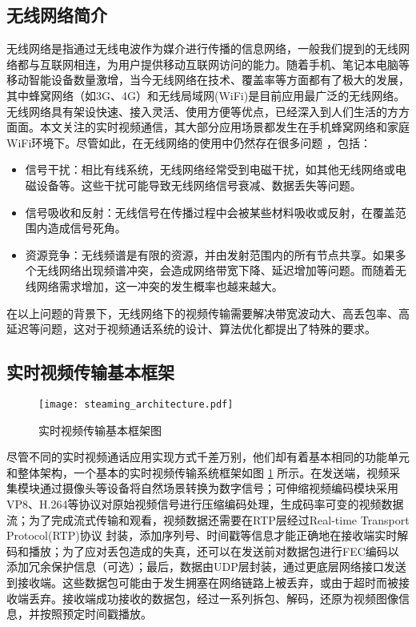 \subsection{无线网络简介}
无线网络是指通过无线电波作为媒介进行传播的信息网络，一般我们提到的无线网络都与互联网相连，为用户提供移动互联网访问的能力。随着手机、笔记本电脑等移动智能设备数量激增，当今无线网络在技术、覆盖率等方面都有了极大的发展，其中蜂窝网络（如3G、4G）和无线局域网(WiFi)是目前应用最广泛的无线网络。无线网络具有架设快速、接入灵活、使用方便等优点，已经深入到人们生活的方方面面。本文关注的实时视频通信，其大部分应用场景都发生在手机蜂窝网络和家庭WiFi环境下。尽管如此，在无线网络的使用中仍然存在很多问题 \cite{heusse2003performance}，包括：
\begin{itemize}
    \item 信号干扰：相比有线系统，无线网络经常受到电磁干扰，如其他无线网络或电磁设备等。这些干扰可能导致无线网络信号衰减、数据丢失等问题。
    \item 信号吸收和反射：无线信号在传播过程中会被某些材料吸收或反射，在覆盖范围内造成信号死角。
    \item 资源竞争：无线频谱是有限的资源，并由发射范围内的所有节点共享。如果多个无线网络出现频谱冲突，会造成网络带宽下降、延迟增加等问题。而随着无线网络需求增加，这一冲突的发生概率也越来越大。
\end{itemize}

在以上问题的背景下，无线网络下的视频传输需要解决带宽波动大、高丢包率、高延迟等问题，这对于视频通话系统的设计、算法优化都提出了特殊的要求。


\subsection{实时视频传输基本框架}

\begin{figure}[htbp]
  \centering
  \texttt{[image: steaming\_architecture.pdf]}
  \caption{实时视频传输基本框架图}
  \label{fig:steaming_architecture}
\end{figure}

尽管不同的实时视频通话应用实现方式千差万别，他们却有着基本相同的功能单元和整体架构，一个基本的实时视频传输系统框架如图 \ref{fig:steaming_architecture} \cite{wu2000transporting}所示。在发送端，视频采集模块通过摄像头等设备将自然场景转换为数字信号；可伸缩视频编码模块采用VP8、H.264等协议对原始视频信号进行压缩编码处理，生成码率可变的视频数据流；为了完成流式传输和观看，视频数据还需要在RTP层经过Real-time Transport Protocol(RTP)协议 \cite{jacobson2003rtp} 封装，添加序列号、时间戳等信息才能正确地在接收端实时解码和播放；为了应对丢包造成的失真，还可以在发送前对数据包进行FEC编码以添加冗余保护信息（可选）；最后，数据由UDP层封装，通过更底层网络接口发送到接收端。这些数据包可能由于发生拥塞在网络链路上被丢弃，或由于超时而被接收端丢弃。接收端成功接收的数据包，经过一系列拆包、解码，还原为视频图像信息，并按照预定时间戳播放。

